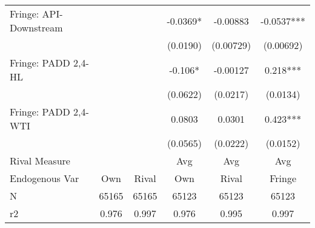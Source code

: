 {\begin{tabular}{l*{5}{c}}
\addlinespace
Fringe: API-Downstream&            &            &  -0.0369*  & -0.00883   &  -0.0537***\\
                &            &            & (0.0190)   &(0.00729)   &(0.00692)   \\
\addlinespace
Fringe: PADD 2,4-HL&            &            &   -0.106*  & -0.00127   &    0.218***\\
                &            &            & (0.0622)   & (0.0217)   & (0.0134)   \\
\addlinespace
Fringe: PADD 2,4-WTI&            &            &   0.0803   &   0.0301   &    0.423***\\
                &            &            & (0.0565)   & (0.0222)   & (0.0152)   \\
\midrule
Rival Measure   &            &            &      Avg   &      Avg   &      Avg   \\
Endogenous Var  &      Own   &    Rival   &      Own   &    Rival   &   Fringe   \\
N               &    65165   &    65165   &    65123   &    65123   &    65123   \\
r2              &    0.976   &    0.997   &    0.976   &    0.995   &    0.997   \\
\bottomrule
\end{tabular}
}
